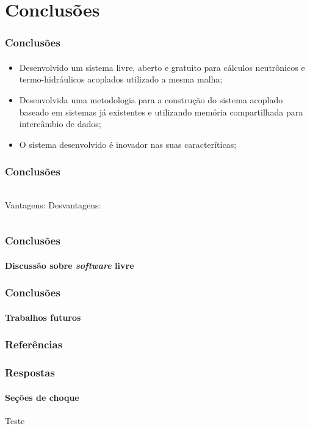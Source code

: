 \documentclass[svgnames,smaller,table]{beamer}
\begin{document}
\section{Conclusões}
\begin{frame}
  \frametitle{Conclusões}
  \framesubtitle{}
  \begin{itemize}
  \item Desenvolvido um sistema livre, aberto e gratuito para cálculos neutrônicos e termo-hidráulicos acoplados utilizado a mesma malha;
  \item Desenvolvida uma metodologia para a construção do sistema acoplado baseado em sistemas já existentes e utilizando memória compartilhada
    para intercâmbio de dados;
  \item O sistema desenvolvido é inovador nas suas caracteríticas;
  \end{itemize}
\end{frame}

\begin{frame}
  \frametitle{Conclusões}
  \framesubtitle{}
  \begin{columns}
    Vantagens:
    Desvantagens:
  \end{columns}
\end{frame}

\begin{frame}
  \frametitle{Conclusões}
  \framesubtitle{Discussão sobre \textit{software} livre}
\end{frame}

\begin{frame}
  \frametitle{Conclusões}
  \framesubtitle{Trabalhos futuros}
\end{frame}



\begin{frame}[allowframebreaks]
        \frametitle{Referências}
        
        
\end{frame}


\begin{frame}[noframenumbering]
  \frametitle{Respostas}
  \framesubtitle{Seções de choque}
  Teste
\end{frame}
\end{document}
